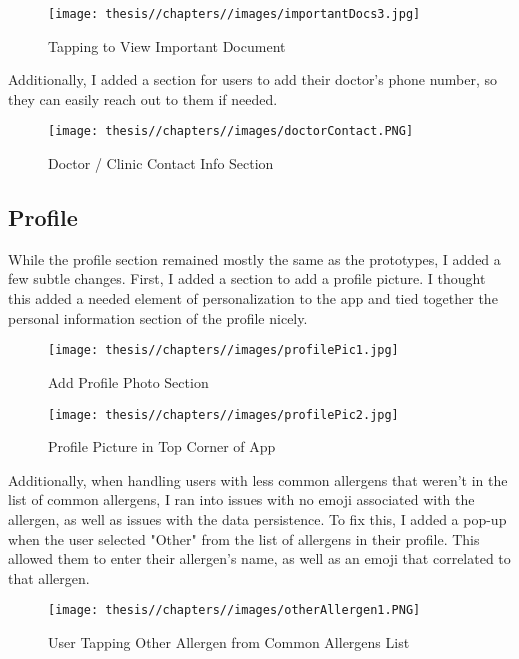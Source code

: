 \begin{figure} [H]
    \centering
    \texttt{[image: thesis//chapters//images/importantDocs3.jpg]}
    \caption{Tapping to View Important Document}
    \label{fig:enter-label}
\end{figure}

Additionally, I added a section for users to add their doctor's phone number, so they can easily reach out to them if needed.

\begin{figure} [H]
    \centering
    \texttt{[image: thesis//chapters//images/doctorContact.PNG]}
    \caption{Doctor / Clinic Contact Info Section}
    \label{fig:enter-label}
\end{figure}

\subsection{Profile}

While the profile section remained mostly the same as the prototypes, I added a few subtle changes. First, I added a section to add a profile picture. I thought this added a needed element of personalization to the app and tied together the personal information section of the profile nicely.

\begin{figure} [H]
    \centering
    \texttt{[image: thesis//chapters//images/profilePic1.jpg]}
    \caption{Add Profile Photo Section}
    \label{fig:enter-label}
\end{figure}

\begin{figure} [H]
    \centering
    \texttt{[image: thesis//chapters//images/profilePic2.jpg]}
    \caption{Profile Picture in Top Corner of App}
    \label{fig:enter-label}
\end{figure}

Additionally, when handling users with less common allergens that weren't in the list of common allergens, I ran into issues with no emoji associated with the allergen, as well as issues with the data persistence. To fix this, I added a pop-up when the user selected "Other" from the list of allergens in their profile. This allowed them to enter their allergen's name, as well as an emoji that correlated to that allergen.

\begin{figure} [H]
    \centering
    \texttt{[image: thesis//chapters//images/otherAllergen1.PNG]}
    \caption{User Tapping Other Allergen from Common Allergens List}
    \label{fig:enter-label}
\end{figure}

